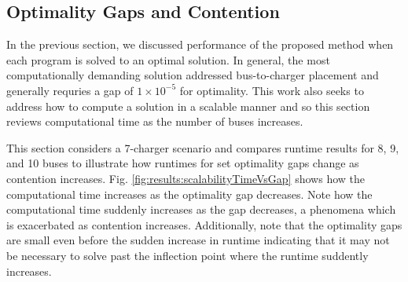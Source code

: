 \subsection{Optimality Gaps and Contention}
In the previous section, we discussed performance of the proposed method when each program is solved to an optimal solution. In general, the most computationally demanding solution addressed bus-to-charger placement and generally requries a gap of $1\times10^{-5}$ for optimality. This work also seeks to address how to compute a solution in a scalable manner and so this section reviews computational time as the number of buses increases.  
\par This section considers a 7-charger scenario and compares runtime results for 8, 9, and 10 buses to illustrate how runtimes for set optimality gaps change as contention increases. Fig. \ref{fig:results:scalabilityTimeVsGap} shows how the computational time increases as the optimality gap decreases. Note how the computational time suddenly increases as the gap decreases, a phenomena which is exacerbated as contention increases. Additionally, note that the optimality gaps are small even before the sudden increase in runtime indicating that it may not be necessary to solve past the inflection point where the runtime suddently increases. 
 

